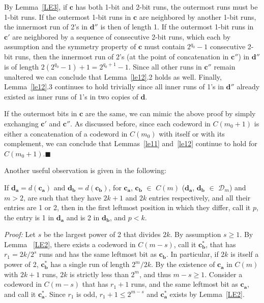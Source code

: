 By Lemma~\ref{LE3}, if $\mathbf{c}$ has both 1-bit and 2-bit runs,
the outermost runs must be 1-bit runs. If the outermost 1-bit runs
in $\mathbf{c}$ are neighbored by another 1-bit runs, the
innermost run of 2's in $\mathbf{d''}$ is then of length 1. If the
outermost 1-bit runs in $\mathbf{c'}$ are neighbored by a sequence
of consecutive 2-bit runs, which each by assumption and the
symmetry property of $\mathbf{c}$ must contain $2^{q_0}-1$
consecutive 2-bit runs, then the innermost run of 2's (at the
point of concatenation in $\mathbf{c''}$) in $\mathbf{d''}$ is of
length $2(2^{q_0}-1)+1=2^{q_0+1}-1$. Since all other runs in
$\mathbf{c''}$ remain unaltered we can conclude that
Lemma~\ref{le12}.2 holds as well. Finally, Lemma~\ref{le12}.3
continues to hold trivially since all inner runs of 1's in
$\mathbf{d''}$ already existed as inner runs of 1's in two copies
of $\mathbf{d}$.

If the outermost bits in $\mathbf{c}$ are the same, we can mimic
the above proof by simply exchanging $\mathbf{c'}$ and
$\mathbf{c''}$. As discussed before, since each codeword in
$C(m_0+1)$ is either a concatenation of a codeword in $C(m_0)$
with itself or with its complement, we can conclude that
Lemmas~\ref{le11} and~\ref{le12} continue to hold for
$C(m_0+1)$.\hfill$\blacksquare$

Another useful observation is given in the following:
\begin{lemma}\label{le14} If $\mathbf{d_a}=d(\mathbf{c_a})$ and $\mathbf{d_b}=d(\mathbf{c_b})$,
for $\mathbf{c_a}$, $\mathbf{c_b}$ $\in$ $C(m)$ ($\mathbf{d_a}$,
$\mathbf{d_b}$ $\in$ $\mathcal{D}_m$) and $m>2$, are such that
they have $2k+1$ and $2k$ entries respectively, and all their
entries are 1 or 2, then in the first leftmost position in which
they differ, call it $p$, the entry is 1 in $\mathbf{d_a}$ and is
2 in $\mathbf{d_b}$, and $p<k$.
\end{lemma}

\noindent \textit{Proof:} Let $s$ be the largest power of 2 that
divides $2k$. By assumption $s \geq 1$. By Lemma ~\ref{LE2}, there
exists a codeword in $C(m-s)$, call it $\mathbf{c_b^{*}}$, that
has $r_1=2k/2^s$ runs and has the same leftmost bit as
$\mathbf{c_b}$. In particular, if $2k$ is itself a power of 2,
$\mathbf{c_b^{*}}$ has a single run of length $2^m/{2k}$. By the
existence of $\mathbf{c_a}$ in $C(m)$ with $2k+1$ runs, $2k$ is
strictly less than $2^m$, and thus $m-s \geq 1$. Consider a
codeword in $C(m-s)$ that has $r_1+1$ runs, and the same leftmost
bit as $\mathbf{c_a}$, and call it $\mathbf{c_a^{*}}$. Since $r_1$
is odd, $r_1+1 \leq 2^{m-s}$ and $\mathbf{c_a^{*}}$ exists by
Lemma~\ref{LE2}.

